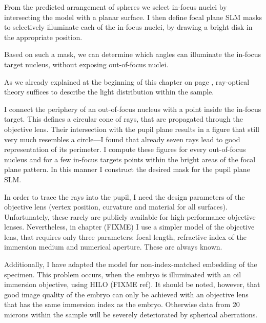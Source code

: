 From the predicted arrangement of spheres we select in-focus nuclei by
intersecting the model with a planar surface. I then define focal
plane SLM masks to selectively illuminate each of the in-focus nuclei,
by drawing a bright disk in the appropriate position.

Based on such a mask, we can determine which angles can illuminate the
in-focus target nucleus, without exposing out-of-focus nuclei.

As we already explained at the beginning of this chapter on page
\pageref{sec:ray-valid}, ray-optical theory suffices to describe the
light distribution within the sample.

I connect the periphery of an out-of-focus nucleus with a point inside
the in-focus target. This defines a circular cone of rays, that are
propagated through the objective lens. Their intersection with the
pupil plane results in a figure that still very much resembles a
circle---I found that already seven rays lead to good representation
of its perimeter.  I compute these figures for every out-of-focus
nucleus and for a few in-focus targets points within the bright areas
of the focal plane pattern. In this manner I construct the desired
mask for the pupil plane SLM.

In order to trace the rays into the pupil, I need the design
parameters of the objective lens (vertex position, curvature and
material for all surfaces). Unfortunately, these rarely are publicly
available for high-performance objective lenses. Nevertheless, in
chapter (FIXME) I use a simpler model of the objective lens, that
requires only three parameters: focal length, refractive index of the
immersion medium and numerical aperture. These are always known.

Additionally, I have adapted the model for non-index-matched embedding
of the specimen. This problem occurs, when the embryo is illuminated
with an oil immersion objective, using HILO (FIXME ref). It should be
noted, however, that good image quality of the embryo can only be
achieved with an objective lens that has the same immersion index as
the embryo. Otherwise data from 20 microns within the sample will be
severely deteriorated by spherical aberrations.

